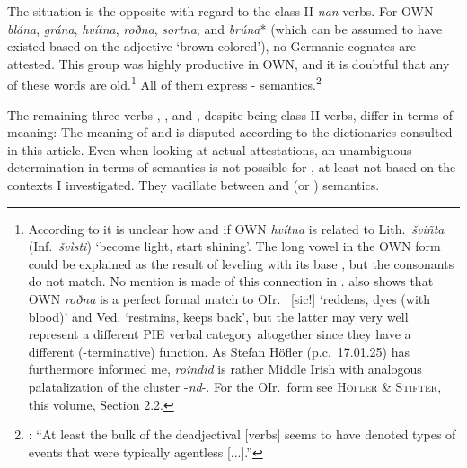 \documentclass[output=paper,colorlinks,citecolor=brown]{langscibook}
\begin{document}
The situation is the opposite with regard to the class II \textit{nan}-verbs. For OWN \textit{blána}, \textit{grána}, \textit{hvítna}, \textit{roðna}, \textit{sortna}, and \textit{brúna}* (which can be assumed to have existed based on the adjective  ‘brown colored’), no Germanic cognates are attested. This group was highly productive in OWN, and it is doubtful that any of these words are old.\footnote{According to \citet[114--115]{Gorbachov2007} it is unclear how and if OWN \textit{hvítna} is related to Lith.\ \textit{šviñta} (Inf.\ \textit{švìsti}) ‘become light, start shining’. The long vowel in the OWN form could be explained as the result of leveling with its base , but the consonants do not match. No mention is made of this connection in . \citet[116]{Gorbachov2007} also shows that OWN \textit{roðna} is a perfect formal match to OIr.\  [sic!] ‘reddens, dyes (with blood)’ and Ved.  ‘restrains, keeps back’, but the latter may very well represent a different PIE verbal category altogether since they have a different (-terminative) function. As Stefan Höfler (p.c.\ 17.01.25) has furthermore informed me, \textit{roindid} is rather Middle Irish with analogous palatalization of the cluster -\textit{nd}-. For the OIr.\ form see \textsc{Höfler \& Stifter}, this volume, Section 2.2.} All of them express - semantics.\footnote{\citet[346]{Ottosson2013}: ``At least the bulk of the deadjectival  [verbs] seems to have denoted types of events that were typically agentless [...].”}

The remaining three verbs , , and , despite being class II verbs, differ in terms of meaning: The meaning of  and  is disputed according to the dictionaries consulted in this article. Even when looking at actual attestations, an unambiguous determination in terms of semantics is not possible for , at least not based on the contexts I investigated. They vacillate between  and  (or ) semantics. 
\end{document}
